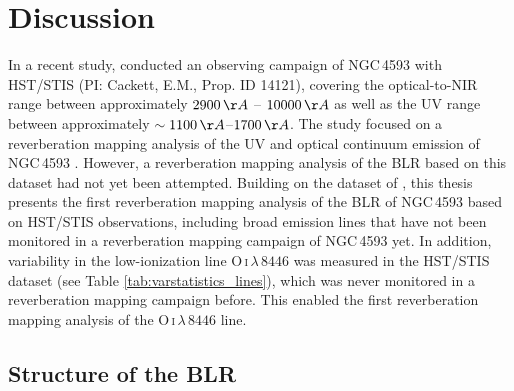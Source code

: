 \chapter{Discussion}

In a recent study, \cite{cackett2018accretion} conducted an observing campaign of NGC\,4593 with HST/STIS (PI: Cackett, E.M., Prop. ID 14121), covering the optical-to-NIR range between approximately $2900\,\AA$ -- $10000\,\AA$ as well as the UV range between approximately $\sim 1100\,\AA$–$1700\,\AA$. The study focused on a reverberation mapping analysis of the UV and optical continuum emission of NGC\,4593 \parencite{cackett2018accretion}. However, a reverberation mapping analysis of the BLR based on this dataset had not yet been attempted. Building on the dataset of \cite{cackett2018accretion}, this thesis presents the first reverberation mapping analysis of the BLR of NGC\,4593 based on HST/STIS observations, including broad emission lines that have not been monitored in a reverberation mapping campaign of NGC\,4593 yet. In addition, variability in the low-ionization line O\,\textsc{i}\,$\lambda\,8446$ was measured in the HST/STIS dataset (see Table \ref{tab:varstatistics_lines}), which was never monitored in a reverberation mapping campaign before. This enabled the first reverberation mapping analysis of the O\,\textsc{i}\,$\lambda\,8446$ line.  
 
\section{Structure of the BLR}
